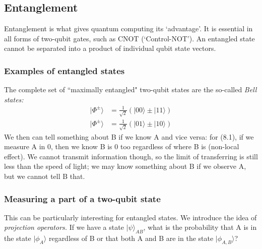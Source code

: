 \documentclass[lasers.tex]{subfiles}
\begin{document}
\chapter{}
\section{Entanglement}
Entanglement is what gives quantum computing its `advantage'.
It is essential in all forms of two-qubit gates, such as CNOT (`Control-NOT').
An entangled state cannot be separated into a product of individual qubit state vectors. 

\subsection{Examples of entangled states}
The complete set of ``maximally entangled" two-qubit states are the so-called \emph{Bell states:}
\begin{align}
    |\Phi^\pm\rangle &= \frac{1}{\sqrt{2}}\left(|00\rangle\pm|11\rangle\right) \\
    |\Phi^\pm\rangle &= \frac{1}{\sqrt{2}}\left(|01\rangle\pm|10\rangle\right)
\end{align}
We then can tell something about B if we know A and vice versa: for (8.1), if we measure A in 0, then we know B is 0 too regardless of where B is (non-local effect). 
We cannot transmit information though, so the limit of transferring is still less than the speed of light; we may know something about B if we observe A, but we cannot tell B that.

\subsection{Measuring a part of a two-qubit state}
This can be particularly interesting for entangled states.
We introduce the idea of \emph{projection operators.}
If we have a state $|\psi\rangle_{AB}$, what is the probability that A is in the state $|\phi_A\rangle$ regardless of B or that both A and B are in the state $|\phi_{A,B}\rangle$?
\end{document}
